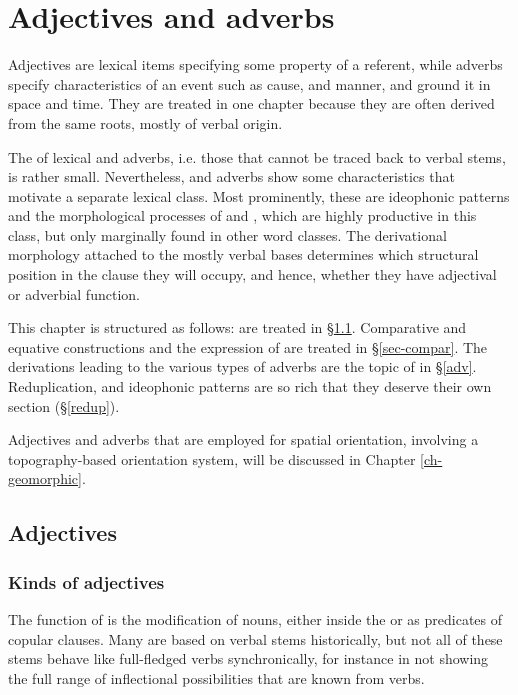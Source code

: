 ﻿
\chapter{Adjectives and adverbs} \label{adj-adv}

Adjectives are lexical items specifying some property of a referent, while adverbs specify characteristics of an event such as cause,  and manner, and ground it in space and time. They are treated in one chapter because they are often derived from the same roots, mostly of verbal origin.  

The  of lexical  and adverbs, i.e. those that cannot be traced back to verbal stems, is rather small. Nevertheless,  and adverbs show some characteristics that motivate a separate lexical class. Most prominently, these are ideophonic patterns and the morphological processes of  and , which are highly  productive in this class, but only marginally found in other word classes. The derivational morphology attached to the mostly verbal bases determines which structural position in the clause they will occupy, and hence, whether they have adjectival or adverbial function. 

This chapter is structured as follows:   are treated in §\ref{adj}. Comparative and equative constructions and the expression of  are treated in §\ref{sec-compar}.  The  derivations leading to the various types of adverbs are the topic of in §\ref{adv}. Reduplication,  and ideophonic patterns are so rich that they deserve their own section (§\ref{redup}). 

Adjectives and adverbs that are employed for  spatial orientation, involving a topography-based  orientation system, will be discussed in Chapter \ref{ch-geomorphic}. 

\section{Adjectives}\label{adj}

\subsection{Kinds of adjectives}\label{adj-kinds}

The function of  is the modification of nouns, either inside the  or as predicates of copular clauses. Many  are based on verbal stems historically, but not all of these stems behave like full-fledged verbs synchronically, for  instance in not showing the full range of inflectional possibilities that are known from verbs. 

